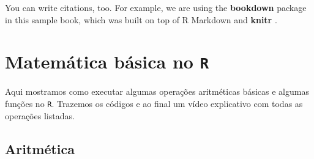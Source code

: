 \documentclass[
  brazilian,
]{book}
\begin{document}
You can write citations, too. For example, we are using the \textbf{bookdown} package \citep{R-bookdown} in this sample book, which was built on top of R Markdown and \textbf{knitr} \citep{xie2015}.

\hypertarget{matemuxe1tica-buxe1sica-no-r}{%
\chapter{\texorpdfstring{Matemática básica no \texttt{R}}{Matemática básica no R}}\label{matemuxe1tica-buxe1sica-no-r}}

Aqui mostramos como executar algumas operações aritméticas básicas e algumas funções no \texttt{R}. Trazemos os códigos e ao final um vídeo explicativo com todas as operações listadas.

\hypertarget{aritmuxe9tica}{%
\section{Aritmética}\label{aritmuxe9tica}}
\end{document}
